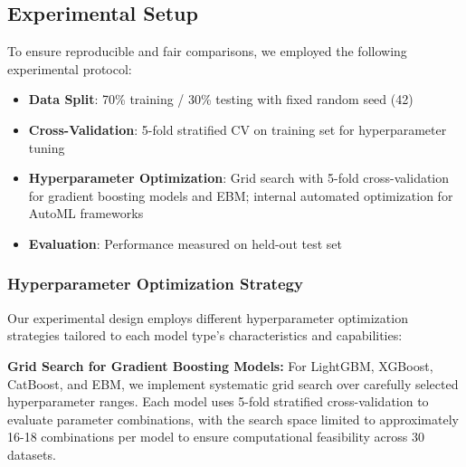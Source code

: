 \documentclass[12pt]{article}
\begin{document}
\subsection{Experimental Setup}

To ensure reproducible and fair comparisons, we employed the following experimental protocol:

\begin{itemize}
\item \textbf{Data Split}: 70\% training / 30\% testing with fixed random seed (42)
\item \textbf{Cross-Validation}: 5-fold stratified CV on training set for hyperparameter tuning
\item \textbf{Hyperparameter Optimization}: Grid search with 5-fold cross-validation for gradient boosting models and EBM; internal automated optimization for AutoML frameworks
\item \textbf{Evaluation}: Performance measured on held-out test set
\end{itemize}

\subsubsection{Hyperparameter Optimization Strategy}

Our experimental design employs different hyperparameter optimization strategies tailored to each model type's characteristics and capabilities:

\textbf{Grid Search for Gradient Boosting Models:} For LightGBM, XGBoost, CatBoost, and EBM, we implement systematic grid search over carefully selected hyperparameter ranges. Each model uses 5-fold stratified cross-validation to evaluate parameter combinations, with the search space limited to approximately 16-18 combinations per model to ensure computational feasibility across 30 datasets.
\end{document}
